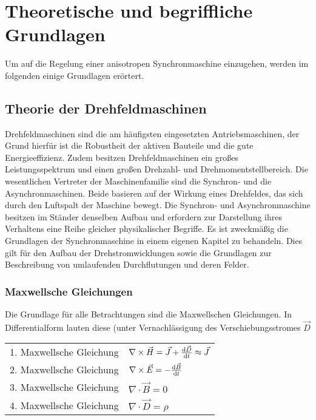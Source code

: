 
\chapter{Theoretische und begriffliche Grundlagen}\label{cha:grundlagen}

Um auf die Regelung einer anisotropen Synchronmaschine einzugehen, werden im folgenden einige Grundlagen erörtert.

\section{Theorie der Drehfeldmaschinen}\label{sec:grund-drehfeld}

Drehfeldmaschinen sind die am häufigsten eingesetzten Antriebsmaschinen, der Grund hierfür ist die Robustheit der aktiven Bauteile und die gute Energieeffizienz.
Zudem besitzen Drehfeldmaschinen ein großes Leistungsspektrum und einen großen Drehzahl- und Drehmomentstellbereich.
Die wesentlichen Vertreter der Maschinenfamilie sind die Synchron- und die Asynchronmaschinen.
Beide basieren auf der Wirkung eines Drehfeldes, das sich durch den Luftspalt der Maschine bewegt.
Die Synchron- und Asynchronmaschine besitzen im Ständer denselben Aufbau und erfordern zur Darstellung ihres Verhaltens eine Reihe gleicher physikalischer Begriffe.
Es ist zweckmäßig die Grundlagen der Synchronmaschine in einem eigenen Kapitel zu behandeln.
Dies gilt \insb für den Aufbau der Drehstromwicklungen sowie die Grundlagen zur Beschreibung von umlaufenden Durchflutungen und deren Felder.

\subsection{Maxwellsche Gleichungen}\label{sec:maxwell}

Die Grundlage für alle Betrachtungen sind die Maxwellschen Gleichungen.
In Differentialform lauten diese (unter Vernachlässigung des Verschiebungsstromes $\vec{D}$

\begin{tabular}{ll}
1. Maxwellsche Gleichung	&	$\nabla \times \vec{H} = \vec{J}+\frac{\mathrm{d}\vec{D}}{\mathrm{d}t} \approx \vec{J}$ \\
2. Maxwellsche Gleichung	&	$\nabla \times \vec{E} = -\frac{\mathrm{d}\vec{B}}{\mathrm{d}t}$ \\
3. Maxwellsche Gleichung	&	$\nabla \cdot \vec{B} = 0$ \\
4. Maxwellsche Gleichung	&	$\nabla \cdot \vec{D} = \rho$
\end{tabular}

